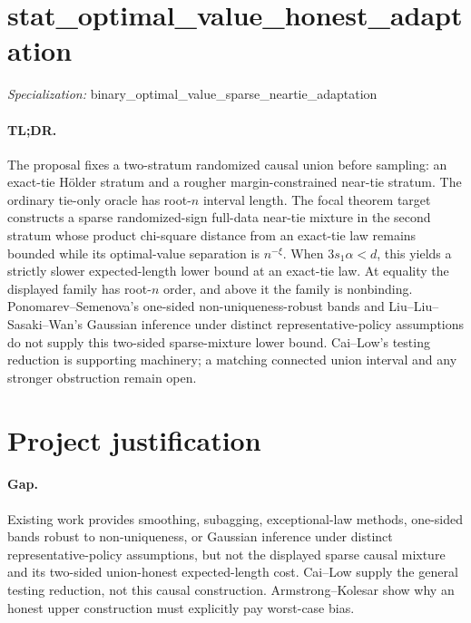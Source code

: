 \documentclass{article}
\begin{document}
\sloppy

\section*{stat\_\allowbreak{}optimal\_\allowbreak{}value\_\allowbreak{}honest\_\allowbreak{}adaptation}

\noindent\textit{Specialization:} binary\_\allowbreak{}optimal\_\allowbreak{}value\_\allowbreak{}sparse\_\allowbreak{}neartie\_\allowbreak{}adaptation\par

\paragraph{TL;DR.} The proposal fixes a two-stratum randomized causal union before sampling: an exact-tie Hölder stratum and a rougher margin-constrained near-tie stratum. The ordinary tie-only oracle has root-\(n\) interval length. The focal theorem target constructs a sparse randomized-sign full-data near-tie mixture in the second stratum whose product chi-square distance from an exact-tie law remains bounded while its optimal-value separation is \(n^{-\xi}\). When \(3s_1\alpha<d\), this yields a strictly slower expected-length lower bound at an exact-tie law. At equality the displayed family has root-\(n\) order, and above it the family is nonbinding. Ponomarev--Semenova's one-sided non-uniqueness-robust bands and Liu--Liu--Sasaki--Wan's Gaussian inference under distinct representative-policy assumptions do not supply this two-sided sparse-mixture lower bound. Cai--Low's testing reduction is supporting machinery; a matching connected union interval and any stronger obstruction remain open.

\section{Project justification}

\paragraph{Gap.} Existing work provides smoothing, subagging, exceptional-law methods, one-sided bands robust to non-uniqueness, or Gaussian inference under distinct representative-policy assumptions, but not the displayed sparse causal mixture and its two-sided union-honest expected-length cost. Cai--Low supply the general testing reduction, not this causal construction. Armstrong--Kolesar show why an honest upper construction must explicitly pay worst-case bias.
\end{document}
